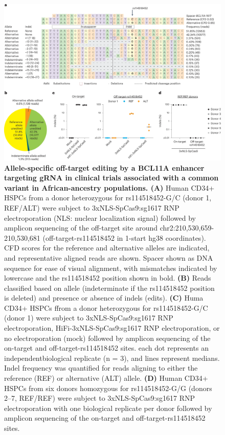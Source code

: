 \documentclass[a4paper, titlepage, openright]{book}
\begin{document}
\begin{figure}
	\centering
	\includegraphics[width=\textwidth]{figures/crisprme6.png}
	\caption[Allele-specific off-target editing by a BCL11A enhancer targeting gRNA in clinical trials associated with a common variant in African-ancestry populations]{\textbf{Allele-specific off-target editing by a BCL11A enhancer targeting gRNA in clinical trials associated with a common variant in African-ancestry populations. (A)} Human CD34+ HSPCs from a donor heterozygous for rs114518452-G/C (donor 1, REF/ALT) were subject to 3xNLS-SpCas9:sg1617 RNP electroporation (NLS: nuclear localization signal) followed by amplicon sequencing of the off-target site around chr2:210,530,659-210,530,681 (off-target-rs114518452 in 1-start hg38 coordinates). CFD scores for the reference and alternative alleles are indicated, and representative aligned reads are shown. Spacer shown as DNA sequence for ease of visual alignment, with mismatches indicated by lowercase and the rs114518452 position shown in bold.  \textbf{(B)} Reads classified based on allele (indeterminate if the rs114518452 position is deleted) and presence or absence of indels (edits). \textbf{(C)} Huma CD34+ HSPCs ffrom a donor heterozygous for rs114518452-G/C (donor 1) were subject to 3xNLS-SpCas9:sg1617 RNP electroporation,  HiFi-3xNLS-SpCas9:sg1617 RNP electroporation, or no electroporation (mock) followed by amplicon sequencing of the on-target and off-target-rs114518452 sites. each dot represents an independentbiological replicate (n = 3), and lines represent medians. Indel frequency was quantified for reads aligning to either the reference (REF) or alternative (ALT) allele. \textbf{(D)} Human CD34+ HSPCs from six donors homozygous for rs114518452-G/G (donors 2–7, REF/REF) were subject to 3xNLS-SpCas9:sg1617 RNP electroporation with one biological replicate per donor followed by amplicon sequencing of the on-target and off-target-rs114518452 sites.}
	\label{fig:crisprme6}
\end{figure}
\end{document}
